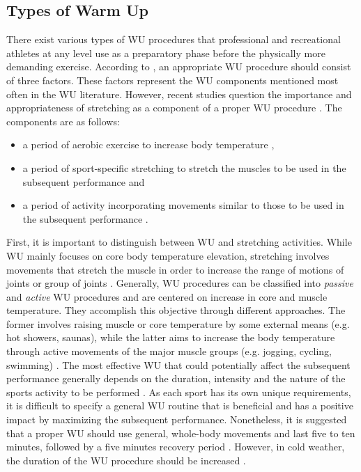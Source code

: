 \subsection{Types of Warm Up}
There exist various types of WU procedures that professional and recreational athletes at any level use as a preparatory phase before the physically more demanding exercise. According to \cite{safran1989warm}, an appropriate WU procedure should consist of three factors. These factors represent the WU components mentioned most often in the WU literature. However, recent studies question the importance and appropriateness of stretching as a component of a proper WU procedure \cite{pereles2012large}. The components are as follows:
\begin{itemize}
\item a period of aerobic exercise to increase body
temperature \cite{safran1989warm},
\item a period of sport-specific stretching to stretch 
the muscles to be used in the subsequent
performance \cite{safran1989warm} and
\item a period of activity incorporating movements
similar to those to be used in the subsequent
performance \cite{safran1989warm}.
\end{itemize}  
First, it is important to distinguish between WU and stretching activities. While WU mainly focuses on core body temperature elevation, stretching involves movements that stretch the muscle in order to increase the range of motions of joints or group of joints \cite{knudson2008warm}. 
Generally, WU procedures can be classified into \textit{passive} and \textit{active} WU procedures and are centered on increase in core and muscle temperature. They accomplish this objective through different approaches. The former involves raising muscle or core temperature by some external means (e.g. hot showers, saunas), while the latter aims to increase the body temperature through active movements of the major muscle groups (e.g. jogging, cycling, swimming) \cite{bishop2003warm2, shellock1985warming}. The most effective WU that could potentially affect the subsequent performance generally depends on the duration, intensity and the nature of the sports activity to be performed \cite{bishop2003warm2}. As each sport has its own unique requirements, it is difficult to specify a general WU routine that is beneficial and has a positive impact by maximizing the subsequent performance. Nonetheless, it is suggested that a proper WU should use general, whole-body movements and last five to ten minutes, followed by a five minutes recovery period \cite{bishop2003warm2}. However, in cold weather, the duration of the WU procedure should be increased \cite{mayr2015prevention}. %
